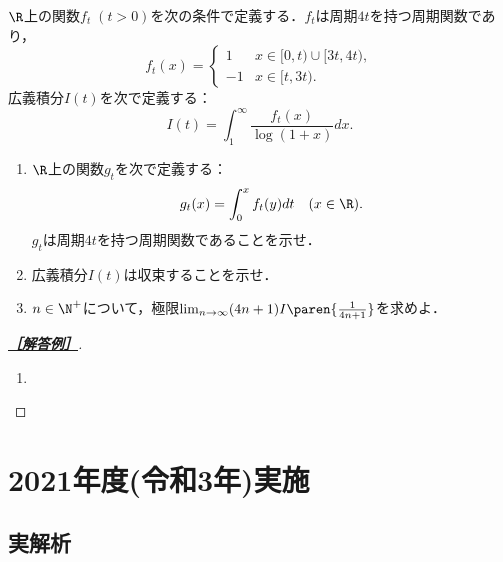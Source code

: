 \documentclass[uplatex,dvipdfmx]{jsarticle}
\begin{document}
\begin{tcolorbox}[colframe=ForestGreen, colback=ForestGreen!10!white,breakable,colbacktitle=ForestGreen!40!white,coltitle=black,fonttitle=\bfseries\sffamily,
    title=A 第5問]
    $\R$上の関数$f_t\;(t>0)$を次の条件で定義する．$f_t$は周期$4t$を持つ周期関数であり，
    \[f_t(x)=\begin{cases}
        1&x\in[0,t)\cup[3t,4t),\\
        -1&x\in[t,3t).
    \end{cases}\]
    広義積分$I(t)$を次で定義する：
    \[I(t)=\int^\infty_1\frac{f_t(x)}{\log(1+x)}dx.\]
    \begin{enumerate}
        \item $\R$上の関数$g_t$を次で定義する：
        \[g_t(x)=\int^x_0f_t(y)dt\quad(x\in\R).\]
        $g_t$は周期$4t$を持つ周期関数であることを示せ．
        \item 広義積分$I(t)$は収束することを示せ．
        \item $n\in\N^+$について，極限$\lim_{n\to\infty}(4n+1)I\paren{\frac{1}{4n+1}}$を求めよ．
    \end{enumerate}
\end{tcolorbox}
\begin{proof}[\textbf{\underline{［解答例］}}]\mbox{}
    \begin{enumerate}
        \item 
    \end{enumerate}
\end{proof}

\section{2021年度(令和3年)実施}

\subsection{実解析}
\end{document}
